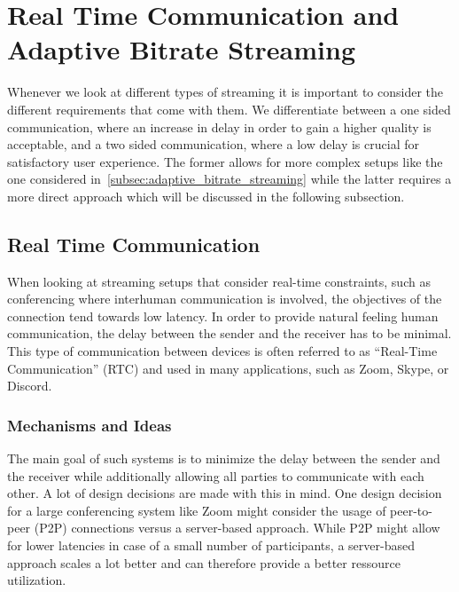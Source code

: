 \section{Real Time Communication and Adaptive Bitrate Streaming}\label{sec:rt_and_adaptive_bitrate_streaming}

Whenever we look at different types of streaming it is important to consider the 
different requirements that come with them.
We differentiate between a one sided communication, where an increase in delay 
in order to gain a higher quality is acceptable, and a two sided communication, 
where a low delay is crucial for satisfactory user experience.
The former allows for more complex setups like the one considered 
in~\autoref{subsec:adaptive_bitrate_streaming} while the latter requires
a more direct approach which will be discussed in the following subsection.

\subsection{Real Time Communication}
When looking at streaming setups that consider real-time constraints, such as conferencing 
where interhuman communication is involved, the objectives of the connection tend towards
low latency.
In order to provide natural feeling human communication, the delay between the sender 
and the receiver has to be minimal.
This type of communication between devices is often referred to as ``Real-Time Communication'' 
(RTC) and used in many applications, such as Zoom, Skype, or Discord.

\subsubsection{Mechanisms and Ideas}
The main goal of such systems is to minimize the delay between the sender and the receiver
while additionally allowing all parties to communicate with each other.
A lot of design decisions are made with this in mind.
One design decision for a large conferencing system like Zoom
might consider the usage of peer-to-peer (P2P) connections versus a server-based
approach.
While P2P might allow for lower latencies in case of a small number of participants,
a server-based approach scales a lot better and can therefore provide a better
ressource utilization.

